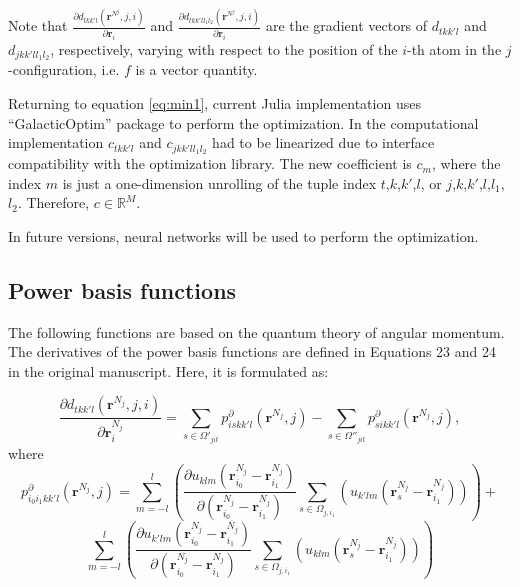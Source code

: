 \documentclass[12pt]{article}
\begin{document}
Note that $ \frac{\partial d_{tkk'l}(\bm r^{N^j}, j, i)}{\partial \bm r_i}$ and $ \frac{\partial d_{tkk'l{l_1}{l_2}}(\bm r^{N^j}, j, i)}{\partial \bm r_i}$
 are the gradient vectors of $d_{tkk'l}$ and $d_{jkk'l{l_1}{l_2}}$, respectively, varying with respect to the position of the $i$-th atom in the $j$-configuration, i.e. $f$ is a vector quantity.


Returning to equation \ref{eq:min1}, current Julia implementation uses ``GalacticOptim'' package to perform the optimization. In the computational implementation $c_{tkk'l}$ and $c_{jkk'l{l_1}{l_2}}$ had to be linearized due to interface compatibility with the optimization library. The new coefficient is $c_{m}$, where the index $m$ is just a one-dimension unrolling of the tuple index $t$,$k$,$k'$,$l$, or $j$,$k$,$k'$,$l$,$l_1$,$l_2$. Therefore, $c \in \mathbb{R}^M$.

In future versions, neural networks will be used to perform the optimization.

\subsection{Power basis functions}

The following functions are based on the quantum theory of angular momentum. The derivatives of the power basis functions are defined in Equations 23 and 24 in the original manuscript. Here, it is formulated as:

\begin{equation}
    \label{eq:derd}
    \frac{\partial d_{tkk'l}(\bm r^{N_j}, j, i)}{\partial \bm r^{N_j}_i} = \sum_{s \in \Omega'_{jit}} p_{iskk'l}^{\partial}(\bm r^{N_j}, j) - \sum_{s \in \Omega''_{jit}} p_{sikk'l}^{\partial} ( \bm r^{N_j}, j),
\end{equation}
where 
\begin{equation}
    p_{i_0i_1kk'l}^{\partial}(\bm r^{N_j}, j) = \sum_{m=-l}^l \left( \frac{\partial u_{klm}(\bm r_{i_0}^{N_j}- \bm r_{i_1}^{N_j})}{\partial (\bm r_{i_0}^{N_j}-\bm r_{i_1}^{N_j})} \sum_{s \in \Omega_{j,i_1}} \left( u_{k'lm} (\bm r^{N_j}_s- \bm r^{N_j}_{i_1}) \right) \right) + 
\end{equation}
\begin{equation*}
\sum_{m=-l}^l \left( \frac{\partial u_{k'lm}(\bm r_{i_0}^{N_j}- \bm r_{i_1}^{N_j})}{\partial (\bm r_{i_0}^{N_j}- \bm r_{i_1}^{N_j})} \sum_{s \in \Omega_{j,i_1}} \left( u_{klm} (\bm r^{N_j}_s- \bm r^{N_j}_{i_1}) \right) \right)
\end{equation*}
\end{document}

